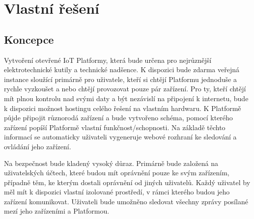 \section{Vlastní řešení}

\subsection{Koncepce}
Vytvoření otevřené IoT Platformy, která bude určena pro nejrůznější elektrotechnické kutily a technické nadšence. K dispozici bude zdarma veřejná instance sloužící primárně pro uživatele, kteří si chtějí Platformu jednoduše a rychle vyzkoušet a nebo chtějí provozovat pouze pár zařízení. Pro ty, kteří chtějí mít plnou kontrolu nad svými daty a být nezávislí na připojení k internetu, bude k dispozici možnost hostingu celého řešení na vlastním hardwaru. K Platformě půjde připojit různorodá zařízení a bude vytvořeno schéma, pomocí kterého zařízení popíší Platformě vlastní funkčnost/schopnosti. Na základě těchto informací se automaticky uživateli vygeneruje webové rozhraní ke sledování a ovládání jeho zařízení.

Na bezpečnost bude kladený vysoký důraz. Primárně bude založená na uživatelských účtech, které budou mít oprávnění pouze ke svým zařízením, případně těm, ke kterým dostali oprávnění od jiných uživatelů. Každý uživatel by měl mít k dispozici vlastní izolované prostředí, v rámci kterého budou jeho zařízení komunikovat. Uživateli bude umožněno sledovat všechny zprávy posílané mezí jeho zařízeními a Platformou.



